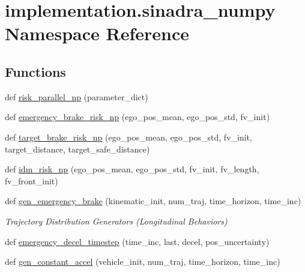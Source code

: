 \hypertarget{namespaceimplementation_1_1sinadra__numpy}{}\section{implementation.\+sinadra\+\_\+numpy Namespace Reference}
\label{namespaceimplementation_1_1sinadra__numpy}
\subsection*{Functions}
\begin{DoxyCompactItemize}
\item 
def \hyperlink{namespaceimplementation_1_1sinadra__numpy_a6d120eefe9aa77a8583707031d3dc5b1}{risk\+\_\+parallel\+\_\+np} (parameter\+\_\+dict)
\item 
def \hyperlink{namespaceimplementation_1_1sinadra__numpy_aae676b8631ad939cd8e14447efa09532}{emergency\+\_\+brake\+\_\+risk\+\_\+np} (ego\+\_\+pos\+\_\+mean, ego\+\_\+pos\+\_\+std, fv\+\_\+init)
\item 
def \hyperlink{namespaceimplementation_1_1sinadra__numpy_a860a27bdddcb077128f658d1f3588b4c}{target\+\_\+brake\+\_\+risk\+\_\+np} (ego\+\_\+pos\+\_\+mean, ego\+\_\+pos\+\_\+std, fv\+\_\+init, target\+\_\+distance, target\+\_\+safe\+\_\+distance)
\item 
def \hyperlink{namespaceimplementation_1_1sinadra__numpy_a52785bad643f89b926726b76c6d2c51a}{idm\+\_\+risk\+\_\+np} (ego\+\_\+pos\+\_\+mean, ego\+\_\+pos\+\_\+std, fv\+\_\+init, fv\+\_\+length, fv\+\_\+front\+\_\+init)
\item 
def \hyperlink{namespaceimplementation_1_1sinadra__numpy_aad679429167f93ab13073831a35cf785}{gen\+\_\+emergency\+\_\+brake} (kinematic\+\_\+init, num\+\_\+traj, time\+\_\+horizon, time\+\_\+inc)
\begin{DoxyCompactList}\small\item\em Trajectory Distribution Generators (Longitudinal Behaviors) \end{DoxyCompactList}\item 
def \hyperlink{namespaceimplementation_1_1sinadra__numpy_a880ff1cd053cbd5833ccb7955baff31c}{emergency\+\_\+decel\+\_\+timestep} (time\+\_\+inc, last, decel, pos\+\_\+uncertainty)
\item 
def \hyperlink{namespaceimplementation_1_1sinadra__numpy_a52a74e6053f94d63450dafb12a21f2d1}{gen\+\_\+constant\+\_\+accel} (vehicle\+\_\+init, num\+\_\+traj, time\+\_\+horizon, time\+\_\+inc)
\item 

\end{DoxyCompactItemize}
